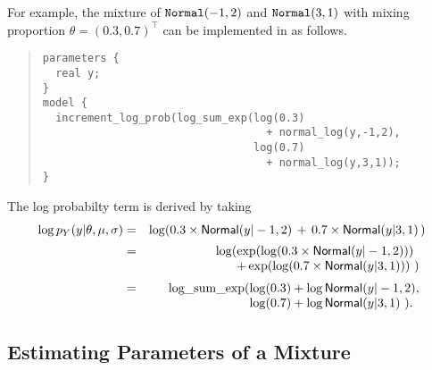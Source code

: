 For example, the mixture of ${\tt Normal}(-1,2)$ and
${\tt Normal}(3,1)$ with mixing proportion $\theta =
(0.3,0.7)^{\top}$ can be implemented in \Stan as follows.
%
\begin{quote}
\begin{Verbatim}[fontsize=\small]
parameters {
  real y;
}
model {
  increment_log_prob(log_sum_exp(log(0.3) 
                                   + normal_log(y,-1,2),
                                 log(0.7) 
                                   + normal_log(y,3,1));
}
\end{Verbatim}
\end{quote}
%
The log probabilty term is derived by taking
%
\begin{eqnarray*}
\log p_Y(y|\theta,\mu,\sigma) & = & \log\!\left( 0.3 \times \mbox{\sf Normal}(y|-1,2) \, + \,
  0.7 \times
  \mbox{\sf Normal}(y|3,1) \, \right)
\\[2pt]
& = & \log(\hspace*{-5pt} \begin{array}[t]{l}
                 \exp(\log(0.3 \times \mbox{\sf Normal}(y|-1,2))) \\
                 + \exp(\log(0.7 \times \mbox{\sf Normal}(y|3,1))) \ )
              \end{array}
\\[2pt]
& = & \mbox{log\_sum\_exp}(\hspace*{-5pt}\begin{array}[t]{l}
                         \log(0.3) + \log \mbox{\sf Normal}(y|-1,2),
                         \\                  
                         \log(0.7) + \log \mbox{\sf Normal}(y|3,1) \ ).
                       \end{array}
\end{eqnarray*}
%

\subsection{Estimating Parameters of a Mixture}

